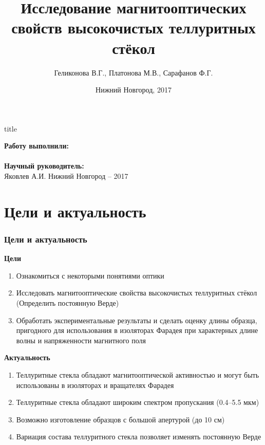 \documentclass[10pt,pdf,hyperref={unicode}, dvipsnames]{beamer}
\title[Магнитооптическая активность теллуритных стёкол]{Исследование магнитооптических свойств высокочистых теллуритных стёкол}
\author{%
	Геликонова В.Г., %
	Платонова М.В., %
	Сарафанов Ф.Г. %
}
\institute{Радиофизический факультет ННГУ, 420 группа}
\date{Нижний Новгород, 2017}
\begin{document}
  

\begin{frame}[plain]
	\centering
	\vspace{2cm}
	\begin{beamercolorbox}[sep=8pt,center]{title}
		\bf{}\inserttitle
	\end{beamercolorbox}
	\vspace{0.5cm}
	\normalsize \textbf{Работу выполнили:}\\
	\large\insertauthor\\ 
	\vspace{0.5cm}
	\normalsize{\textbf{Научный руководитель:}\\}
	\large{Яковлев А.И.}
	\vfill
	\small{Нижний Новгород -- 2017}
\end{frame}
\section{Цели и актуальность}
\begin{frame}[t]
	\frametitle{Цели и актуальность}
	\textbf{Цели}\\
	\begin{enumerate}
		\item Ознакомиться с некоторыми понятиями оптики
		\item Исследовать магнитооптические свойства высокочистых теллуритных стёкол (Определить постоянную Верде)
		\item Обработать экспериментальные  результаты и сделать оценку длины образца, пригодного для использования в изоляторах Фарадея 
		при характерных длине волны и напряженности магнитного поля
	\end{enumerate}
	\textbf{Актуальность}\\
	\begin{enumerate}
		\item Теллуритные стекла обладают магнитооптической активностью и могут быть использованы в изоляторах и вращателях Фарадея
		\item Теллуритные стекла обладают широким спектром пропускания (0.4--5.5  мкм) %
		\item Возможно изготовление образцов с большой апертурой (до 10 см)
		\item Вариация состава теллуритного стекла позволяет изменять постоянную Верде
	\end{enumerate}
\end{frame}
\end{document}
